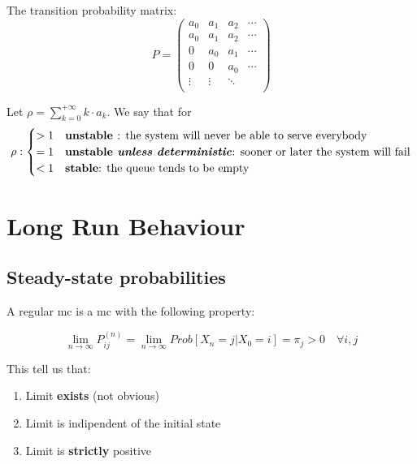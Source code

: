 The transition probability matrix:
\begin{equation} P=\begin{pmatrix}
	a_{0} & a_{1} & a_2 & \cdots  \\
	a_{0} & a_{1} & a_2 & \cdots  \\
	0			& a_{0} & a_{1} & \cdots  \\
	0 		& 0			& a_{0} & \cdots  \\
	\vdots & \vdots & \ddots &  \\
\end{pmatrix}
\end{equation}
\begin{definition}[Behavior of a MC]
Let $\rho=\sum\limits_{k=0}^{+\infty} k \cdot a_k$. We say that for
\begin{equation} \rho : \begin{cases}
	>1 & \text{\textbf{unstable }: the system will never be able to serve everybody}\\
	=1 & \text{\textbf{unstable \textit{unless deterministic}}: sooner or later the system will fail}\\
	<1 & \text{\textbf{stable}: the queue tends to be empty}
\end{cases}\end{equation}
\end{definition}

\section{Long Run Behaviour}

\subsection{Steady-state probabilities}

	\begin{definition}
		A regular \gls{mc} is a \gls{mc} with the following property:

		\begin{equation} \lim_{n \to \infty} P_{ij}^{(n)} = \lim_{ n \to \infty} Prob[ X_n=j | X_0 =i] = \pi_j > 0 \quad \forall i, j \end{equation}

	\end{definition}

	This tell us that:
	\begin{enumerate}
		\item Limit \textbf{exists} (not obvious)
		\item Limit is indipendent of the initial state
		\item Limit is \textbf{strictly} positive
	\end{enumerate}

